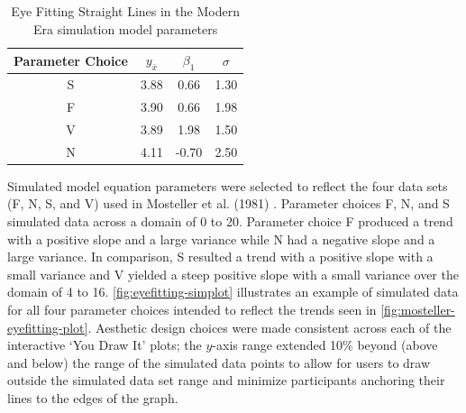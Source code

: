 \documentclass[print]{nuthesis}
\begin{document}
\begin{table}

\caption{\label{tab:eyefitting-parameters}Eye Fitting Straight Lines in the Modern Era simulation model parameters}
\centering
\begin{tabular}[t]{cccc}
\toprule
Parameter Choice & $y_{\bar{x}}$ & $\beta_1$ & $\sigma$\\
\midrule
S & 3.88 & 0.66 & 1.30\\
F & 3.90 & 0.66 & 1.98\\
V & 3.89 & 1.98 & 1.50\\
N & 4.11 & -0.70 & 2.50\\
\bottomrule
\end{tabular}
\end{table}

Simulated model equation parameters were selected to reflect the four data sets (F, N, S, and V) used in Mosteller et al. (1981) .
Parameter choices F, N, and S simulated data across a domain of 0 to 20.
Parameter choice F produced a trend with a positive slope and a large variance while N had a negative slope and a large variance.
In comparison, S resulted a trend with a positive slope with a small variance and V yielded a steep positive slope with a small variance over the domain of 4 to 16.
\cref{fig:eyefitting-simplot} illustrates an example of simulated data for all four parameter choices intended to reflect the trends seen in \cref{fig:mosteller-eyefitting-plot}.
Aesthetic design choices were made consistent across each of the interactive `You Draw It' plots; the \(y\)-axis range extended 10\% beyond (above and below) the range of the simulated data points to allow for users to draw outside the simulated data set range and minimize participants anchoring their lines to the edges of the graph.
\end{document}
